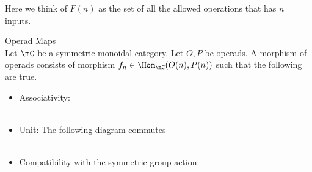 \documentclass[a4paper]{article}
\begin{document}
Here we think of $F(n)$ as the set of all the allowed operations that has $n$ inputs. 

\begin{defn}{Operad Maps}{}\\
Let $\mC$ be a symmetric monoidal category. Let $O,P$ be operads. A morphism of operads consists of morphism $f_n\in\Hom_\mC(O(n),P(n))$ such that the following are true. 
\begin{itemize}
\item Associativity: \\
 \\
\item Unit: The following diagram commutes \\
 \\
\item Compatibility with the symmetric group action: 
\end{itemize}
\end{defn}
\end{document}
